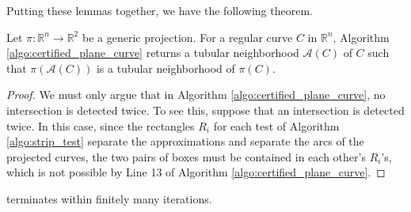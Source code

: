 
Putting these lemmas together, we have the following theorem.

\begin{thm}
    Let $\pi:\mathbb{R}^n\rightarrow\mathbb{R}^2$ be a generic projection. For a regular curve $C$ in $\mathbb{R}^n$, Algorithm \ref{algo:certified_plane_curve} returns a tubular neighborhood $\mathcal{A}(C)$ of $C$ such that $\pi(\mathcal{A}(C))$ is a tubular neighborhood of $\pi(C)$. 
\end{thm}
\begin{proof}
We must only argue that in Algorithm \ref{algo:certified_plane_curve}, no intersection is detected twice.  To see this, suppose that an intersection is detected twice.  In this case, since the rectangles $R_i$ for each test of Algorithm \ref{algo:strip_test} separate the approximations and separate the arcs of the projected curves, the two pairs of boxes must be contained in each other's $R_i$'s, which is not possible by Line 13 of Algorithm \ref{algo:certified_plane_curve}.  
\end{proof}

\begin{thm}
     terminates within finitely many iterations.
\end{thm}


